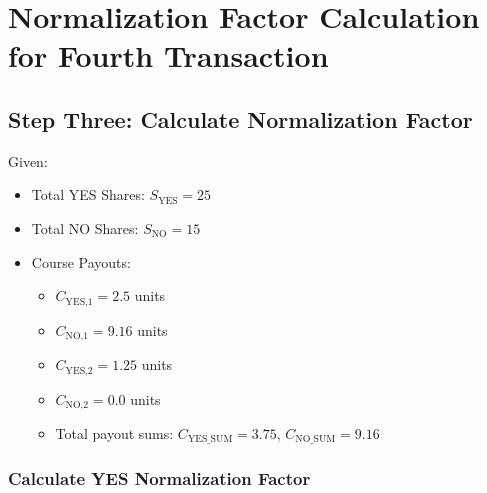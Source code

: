 \documentclass{article}
\begin{document}
\begin{center}
\end{center}

\section*{Normalization Factor Calculation for Fourth Transaction}

\subsection*{Step Three: Calculate Normalization Factor}

Given:
\begin{itemize}
    \item Total YES Shares: \( S_{\text{YES}} = 25 \)
    \item Total NO Shares: \( S_{\text{NO}} = 15 \)
    \item Course Payouts:
    \begin{itemize}
        \item \( C_{\text{YES,1}} = 2.5 \) units
        \item \( C_{\text{NO,1}} = 9.16 \) units
        \item \( C_{\text{YES,2}} = 1.25 \) units
        \item \( C_{\text{NO,2}} = 0.0 \) units
        \item Total payout sums: \( C_{\text{YES\_SUM}} = 3.75 \), \( C_{\text{NO\_SUM}} = 9.16 \)
    \end{itemize}
\end{itemize}

\subsubsection*{Calculate YES Normalization Factor}
\end{document}
